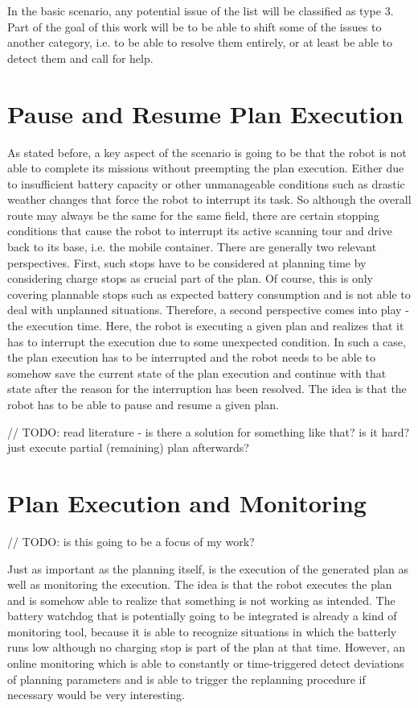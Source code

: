 \documentclass[german, master, expose, latin1]{base/thesis_KBS}
\begin{document}
In the basic scenario, any potential issue of the list will be classified as type $3$. Part of the goal of this work will be to be able to shift some of the
issues to another category, i.e. to be able to resolve them entirely, or at least be able to detect them and call for help.

\section{Pause and Resume Plan Execution}

As stated before, a key aspect of the scenario is going to be that the robot is not able to complete its missions without preempting the plan execution.
Either due to insufficient battery capacity or other unmanageable conditions such as drastic weather changes that force the robot to interrupt its task.
So although the overall route may always be the same for the same field, there are certain stopping conditions that cause the robot to interrupt its 
active scanning tour and drive back to its base, i.e. the mobile container.
There are generally two relevant perspectives. First, such stops have to be considered at planning time by considering charge stops as crucial part of the plan.
Of course, this is only covering plannable stops such as expected battery consumption and is not able to deal with unplanned situations.
Therefore, a second perspective comes into play - the execution time. Here, the robot is executing a given plan and realizes that it has to interrupt the execution
due to some unexpected condition. In such a case, the plan execution has to be interrupted and the robot needs to be able to somehow save the current state of the plan
execution and continue with that state after the reason for the interruption has been resolved.
The idea is that the robot has to be able to pause and resume a given plan.\newline

// TODO: read literature - is there a solution for something like that? is it hard? just execute partial (remaining) plan afterwards?

\section{Plan Execution and Monitoring}

// TODO: is this going to be a focus of my work?\newline

Just as important as the planning itself, is the execution of the generated plan as well as monitoring the execution.
The idea is that the robot executes the plan and is somehow able to realize that something is not working as intended. 
The battery watchdog that is potentially going to be integrated is already a kind of monitoring tool, because it is able to recognize situations 
in which the batterly runs low although no charging stop is part of the plan at that time. However, an online monitoring which is able to constantly or time-triggered 
detect deviations of planning parameters and is able to trigger the replanning procedure if necessary would be very interesting.\newline
\end{document}
